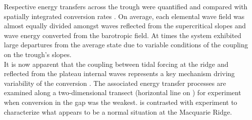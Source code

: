 \documentclass[12pt]{article}
\begin{document}
Respective energy transfers across the trough were quantified and compared with spatially 
integrated conversion rates . On average, each elemental wave field 
was almost equally divided amongst waves reflected from the supercritical slopes and wave energy 
converted from the barotropic field. At times the system exhibited large departures from the 
average state due to variable conditions of the coupling on the trough's slopes.\\

It is now apparent that the coupling between tidal forcing at the ridge and reflected 
from the plateau internal waves represents a key mechanism driving variability of the 
conversion . The associated energy transfer processes are examined along a 
two-dimensional transect (horizontal line on ) for 
experiment  when conversion in the gap was the weakest.  is contrasted with 
experiment  to characterize what appears to be a normal situation at the Macquarie 
Ridge.

%

\end{document}
